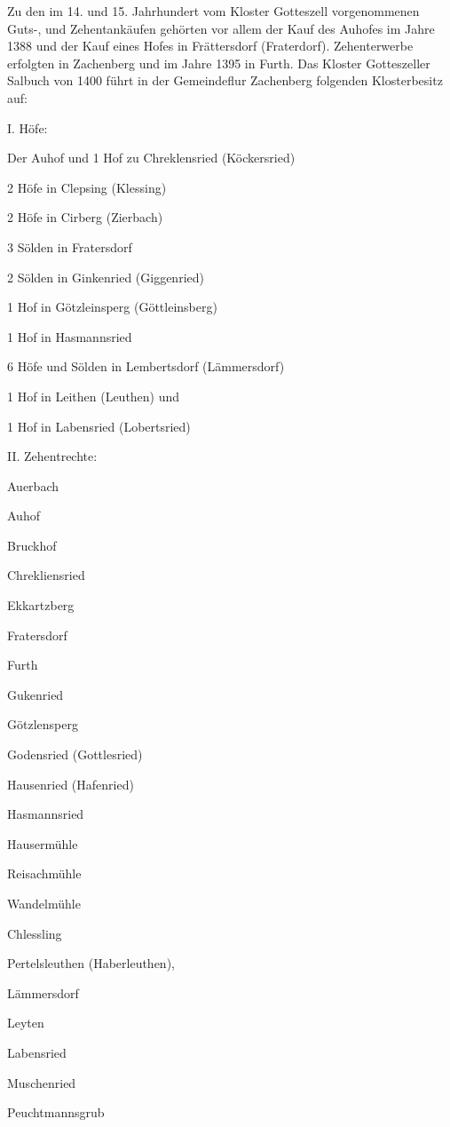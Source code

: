 \documentclass{book}
\begin{document}
Zu den im 14. und 15. Jahrhundert vom Kloster Gotteszell vorgenommenen Guts-,
und Zehentankäufen gehörten vor allem der Kauf des Auhofes im Jahre 1388 und der
Kauf eines Hofes in Frättersdorf (Fraterdorf). Zehenterwerbe erfolgten in
Zachenberg und im Jahre 1395 in Furth. Das Kloster Gotteszeller Salbuch von 1400
führt in der Gemeindeflur Zachenberg folgenden Klosterbesitz auf:



I. Höfe:



Der Auhof und 1 Hof zu Chreklensried (Köckersried)

2 Höfe in Clepsing (Klessing)

2 Höfe in Cirberg (Zierbach)

3 Sölden in Fratersdorf

2 Sölden in Ginkenried (Giggenried)

1 Hof in Götzleinsperg (Göttleinsberg)

1 Hof in Hasmannsried

6 Höfe und Sölden in Lembertsdorf (Lämmersdorf)

1 Hof in Leithen (Leuthen) und

1 Hof in Labensried (Lobertsried)



II. Zehentrechte:



Auerbach

Auhof

Bruckhof

Chrekliensried

Ekkartzberg

Fratersdorf

Furth

Gukenried

Götzlensperg

Godensried (Gottlesried)

Hausenried (Hafenried)

Hasmannsried

Hausermühle

Reisachmühle

Wandelmühle

Chlessling

Pertelsleuthen (Haberleuthen),

Lämmersdorf

Leyten

Labensried

Muschenried

Peuchtmannsgrub
\end{document}
